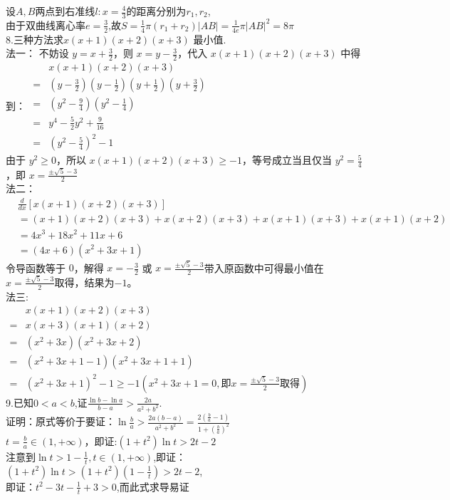 \documentclass[a4paper,11pt,UTF8]{article}
\begin{document}
设$A,B$两点到右准线$\displaystyle l:x=\frac{4}{3}$的距离分别为$r_1,r_2$,\\由于双曲线离心率$\displaystyle e=\frac{3}{2}$,故$\displaystyle S=\frac{1}{4}\pi(r_1+r_2)|AB|=\frac{1}{4e}\pi|AB|^2=8\pi$\\
8.$\text{三种方法求}x(x+1)(x+2)(x+3)\text{ 最小值.}$\\
法一：
不妨设 $\displaystyle y = x + \frac{3}{2}$，则 $\displaystyle x = y - \frac{3}{2}$，代入 $x(x+1)(x+2)(x+3)$ 中得到：
$\begin{aligned}
	&x(x+1)(x+2)(x+3)\\
	=& (y-\frac{3}{2})(y-\frac{1}{2})(y+\frac{1}{2})(y+\frac{3}{2}) \\
	=& (y^2 - \frac{9}{4})(y^2 - \frac{1}{4}) \\
	=& y^4 - \frac{5}{2}y^2 + \frac{9}{16}\\
	=&(y^2-\frac{5}{4})^2-1
\end{aligned}
$\\ 
由于 $y^2\geq 0$，所以 $\displaystyle x(x+1)(x+2)(x+3) \geq-1$，等号成立当且仅当 $\displaystyle y^2 = \frac{5}{4}$，即 $\displaystyle x = \frac{\pm\sqrt{5}-3}{2}$\\
法二：
\begin{align*}
	&\frac{d}{dx} [x(x+1)(x+2)(x+3)]\\
	 &= (x+1)(x+2)(x+3) + x(x+2)(x+3) + x(x+1)(x+3) + x(x+1)(x+2) \\
	&= 4x^3 + 18x^2 + 11x + 6\\
	&=(4x+6)(x^2+3x+1)
\end{align*}
令导函数等于 $0$，解得 $\displaystyle x = -\frac{3}{2}$ 或 $\displaystyle x = \frac{\pm\sqrt{5}-3}{2}$带入原函数中可得最小值在$\displaystyle x = \frac{\pm\sqrt{5}-3}{2}$取得，结果为$-1$。\\
法三:\\
$\begin{aligned}
	&x(x+1)(x+2)(x+3)\\
	=&x(x+3)(x+1)(x+2)\\
	=&(x^2+3x)(x^2+3x+2)\\
	=&(x^2+3x+1-1)(x^2+3x+1+1)\\
	=&(x^2+3x+1)^2-1\geq-1(x^2+3x+1=0,\text{即}\displaystyle x = \frac{\pm\sqrt{5}-3}{2}\text{取得})
\end{aligned}$\\
9.已知$\displaystyle0<a<b$,$\displaystyle\text{证}\frac{\ln b-\ln a}{b-a}>\frac{2a}{a^2+b^2}.$\\
证明：原式等价于要证：$\displaystyle\ln\frac{b}{a}>\frac{2a(b-a)}{a^2+b^2}=\frac{2(\frac{b}{a}-1)}{1+(\frac{b}{a})^2}$\\
$\displaystyle t=\frac{b}{a}\in(1,+\infty)$，即证:$(1+t^2)\ln t>2t-2$\\
注意到$\displaystyle\ln t >1-\frac{1}{t}, t\in(1,+\infty)$,即证：$\displaystyle(1+t^2)\ln t>(1+t^2)(1-\frac{1}{t})>2t-2$,\\
即证：$\displaystyle t^2-3t-\frac{1}{t}+3>0$,而此式求导易证
\end{document}
